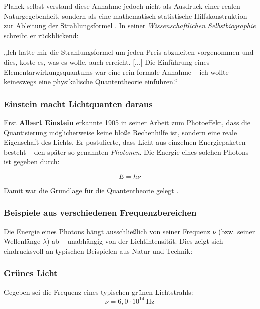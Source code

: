 Planck selbst verstand diese Annahme jedoch nicht als Ausdruck einer realen Naturgegebenheit, sondern als eine mathematisch-statistische Hilfskonstruktion zur Ableitung der Strahlungsformel \cite{planck1948}. In seiner \emph{Wissenschaftlichen Selbstbiographie} schreibt er rückblickend:
	\medskip
\begin{tcolorbox}[physikbox, title={Max Plank (1905)\cite{planck1948}}]
	\label{box:planck1948}
	„Ich hatte mir die Strahlungsformel um jeden Preis abzuleiten vorgenommen und dies, koste es, was es wolle, auch erreicht. [...] Die Einführung eines Elementarwirkungsquantums war eine rein formale Annahme – ich wollte keineswegs eine physikalische Quantentheorie einführen.“
\end{tcolorbox}

\subsubsection{Einstein macht Lichtquanten daraus}

Erst \textbf{Albert Einstein} erkannte 1905 in seiner Arbeit zum Photoeffekt, dass die Quantisierung möglicherweise keine bloße Rechenhilfe ist, sondern eine reale Eigenschaft des Lichts. Er postulierte, dass Licht aus einzelnen Energiepaketen besteht – den später so genannten \emph{Photonen}. Die Energie eines solchen Photons ist gegeben durch:

\begin{equation}
	E = h \nu
\end{equation}

Damit war die Grundlage für die Quantentheorie gelegt \cite{einstein1905}.

\subsubsection{Beispiele aus verschiedenen Frequenzbereichen}

Die Energie eines Photons hängt ausschließlich von seiner Frequenz $\nu$ (bzw. seiner Wellenlänge $\lambda$) ab – unabhängig von der Lichtintensität. Dies zeigt sich eindrucksvoll an typischen Beispielen aus Natur und Technik:

\subsubsection*{Grünes Licht}
Gegeben sei die Frequenz eines typischen grünen Lichtstrahls:
\[
\nu = 6{,}0 \cdot 10^{14}~\mathrm{Hz}
\]

